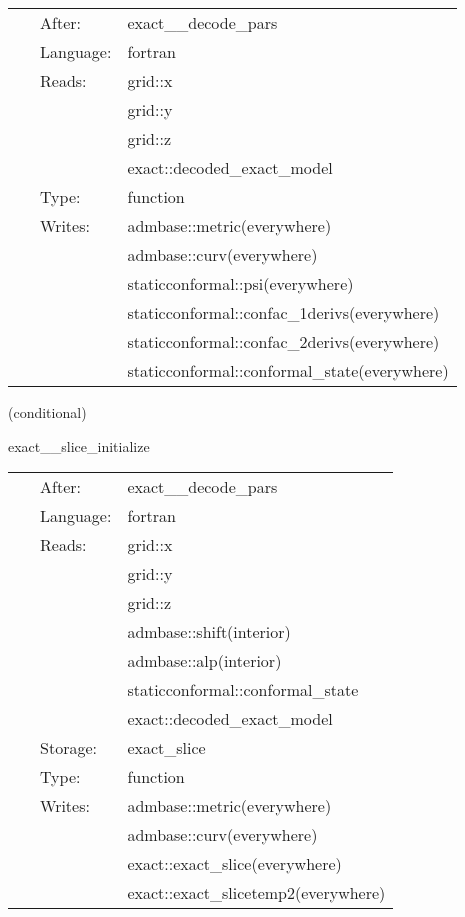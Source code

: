 \hspace{5mm}{\it set initial data from exact solution on a trivial slice } 


\hspace{5mm}

 \begin{tabular*}{160mm}{cll} 
~ & After:  & exact\_\_decode\_pars \\ 
~ & Language:  & fortran \\ 
~ & Reads:  & grid::x \\ 
~& ~ &grid::y\\ 
~& ~ &grid::z\\ 
~& ~ &exact::decoded\_exact\_model\\ 
~ & Type:  & function \\ 
~ & Writes:  & admbase::metric(everywhere) \\ 
~& ~ &admbase::curv(everywhere)\\ 
~& ~ &staticconformal::psi(everywhere)\\ 
~& ~ &staticconformal::confac\_1derivs(everywhere)\\ 
~& ~ &staticconformal::confac\_2derivs(everywhere)\\ 
~& ~ &staticconformal::conformal\_state(everywhere)\\ 
\end{tabular*} 


\vspace{5mm}

   (conditional) 

\hspace{5mm} exact\_\_slice\_initialize 

\hspace{5mm}{\it set initial data from exact solution on an arbitrary slice } 


\hspace{5mm}

 \begin{tabular*}{160mm}{cll} 
~ & After:  & exact\_\_decode\_pars \\ 
~ & Language:  & fortran \\ 
~ & Reads:  & grid::x \\ 
~& ~ &grid::y\\ 
~& ~ &grid::z\\ 
~& ~ &admbase::shift(interior)\\ 
~& ~ &admbase::alp(interior)\\ 
~& ~ &staticconformal::conformal\_state\\ 
~& ~ &exact::decoded\_exact\_model\\ 
~ & Storage:  & exact\_slice \\ 
~ & Type:  & function \\ 
~ & Writes:  & admbase::metric(everywhere) \\ 
~& ~ &admbase::curv(everywhere)\\ 
~& ~ &exact::exact\_slice(everywhere)\\ 
~& ~ &exact::exact\_slicetemp2(everywhere)\\ 
\end{tabular*} 


